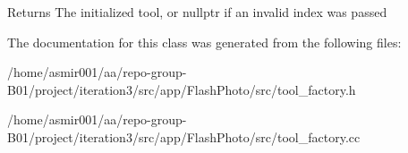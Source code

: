 \begin{DoxyReturn}{Returns}
The initialized tool, or nullptr if an invalid index was passed 
\end{DoxyReturn}


The documentation for this class was generated from the following files\+:\begin{DoxyCompactItemize}
\item 
/home/asmir001/aa/repo-\/group-\/\+B01/project/iteration3/src/app/\+Flash\+Photo/src/tool\+\_\+factory.\+h\item 
/home/asmir001/aa/repo-\/group-\/\+B01/project/iteration3/src/app/\+Flash\+Photo/src/tool\+\_\+factory.\+cc\end{DoxyCompactItemize}
